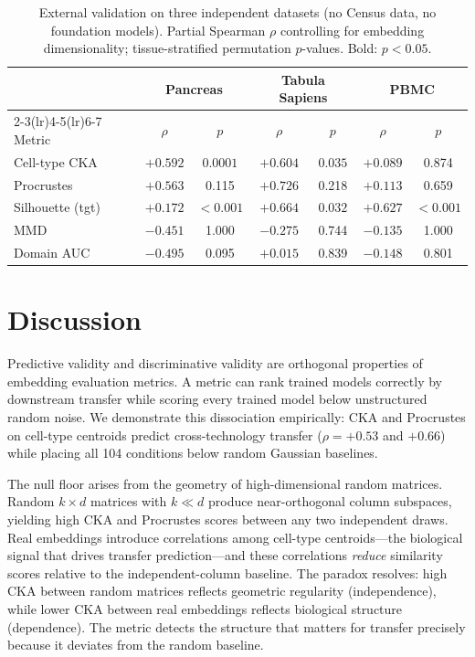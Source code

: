 \documentclass[11pt]{article}
\begin{document}
\begin{table}[t]
\centering
\caption{External validation on three independent datasets (no Census
data, no foundation models). Partial Spearman $\rho$ controlling for
embedding dimensionality; tissue-stratified permutation $p$-values.
Bold: $p < 0.05$.}
\label{tab:external}
\small
\begin{tabular}{@{}lcccccc@{}}
\toprule
& \multicolumn{2}{c}{Pancreas} & \multicolumn{2}{c}{Tabula Sapiens} & \multicolumn{2}{c}{PBMC} \\
\cmidrule(lr){2-3}\cmidrule(lr){4-5}\cmidrule(lr){6-7}
Metric & $\rho$ & $p$ & $\rho$ & $p$ & $\rho$ & $p$ \\
\midrule
Cell-type CKA & $+0.592$ & $\mathbf{0.0001}$ & $+0.604$ & $\mathbf{0.035}$ & $+0.089$ & 0.874 \\
Procrustes    & $+0.563$ & 0.115              & $+0.726$ & 0.218             & $+0.113$ & 0.659 \\
\midrule
Silhouette (tgt) & $+0.172$ & $\mathbf{<0.001}$ & $+0.664$ & $\mathbf{0.032}$ & $+0.627$ & $\mathbf{<0.001}$ \\
MMD              & $-0.451$ & 1.000              & $-0.275$ & 0.744             & $-0.135$ & 1.000 \\
Domain AUC       & $-0.495$ & 0.095              & $+0.015$ & 0.839             & $-0.148$ & 0.801 \\
\bottomrule
\end{tabular}
\end{table}


\section{Discussion}
\label{sec:discussion}

Predictive validity and discriminative validity are orthogonal
properties of embedding evaluation metrics. A metric can rank trained
models correctly by downstream transfer while scoring every trained
model below unstructured random noise. We demonstrate this dissociation
empirically: CKA and Procrustes on cell-type centroids predict
cross-technology transfer ($\rho = +0.53$ and $+0.66$) while placing
all 104 conditions below random Gaussian baselines.

The null floor arises from the geometry of high-dimensional random
matrices. Random $k \times d$ matrices with $k \ll d$ produce
near-orthogonal column subspaces, yielding high CKA and Procrustes
scores between any two independent draws. Real embeddings introduce
correlations among cell-type centroids---the biological signal that
drives transfer prediction---and these correlations \emph{reduce}
similarity scores relative to the independent-column baseline. The
paradox resolves: high CKA between random matrices reflects geometric
regularity (independence), while lower CKA between real embeddings
reflects biological structure (dependence). The metric detects the
structure that matters for transfer precisely because it deviates from
the random baseline.
\end{document}
